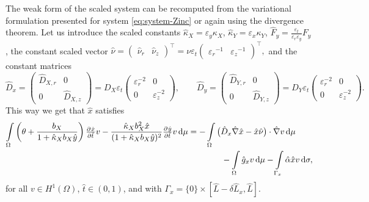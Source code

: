 \documentclass[11pt]{article}
\numberwithin{equation}{section}
\begin{document}
The weak form of the scaled system can be recomputed from the variational formulation presented for system \eqref{eq:system-Zinc} or again using the divergence theorem. %
Let us introduce the scaled constants 
\(\hat{\kappa}_X = \varepsilon_y \kappa_X\), \(\hat{\kappa}_Y = \varepsilon_x \kappa_Y\), \(\hat{F}_y = \frac{\varepsilon_t}{\varepsilon_r \varepsilon_y} F_y \),
the constant scaled vector 
\(
    \hat{\nu} = 
    (\begin{smallmatrix}
        \hat{\nu}_r
        &
        \hat{\nu}_z
    \end{smallmatrix})^\top
    =
    \nu \varepsilon_t
    (\begin{smallmatrix}
        {\varepsilon_r}^{-1}
        &
        {\varepsilon_z}^{-1}
    \end{smallmatrix})^\top,
\) 
and the constant matrices
\[
    \hat{D}_x = 
    \begin{pmatrix}
         \hat{D}_{X,r} & 0 
         \\
        0 &  \hat{D}_{X,z}
    \end{pmatrix}
    =
    D_X \varepsilon_t
    \begin{pmatrix}
         \varepsilon_r^{-2} & 0 
         \\
        0 &  \varepsilon_z^{-2}
    \end{pmatrix}
    ,\qquad
    \hat{D}_y = 
    \begin{pmatrix}
         \hat{D}_{Y,r} & 0 
         \\
        0 &  \hat{D}_{Y,z}
    \end{pmatrix}
    =
    D_Y \varepsilon_t
    \begin{pmatrix}
         \varepsilon_r^{-2} & 0 
         \\
        0 &  \varepsilon_z^{-2}
    \end{pmatrix}.
\]
This way we get that \( \hat{x}\) satisfies
\begin{equation}
\label{eq:non-dim-x}
\begin{aligned}
    \int\limits_\Omega
    \left( \theta + \frac{b_X}{1 + \hat{\kappa}_X b_X \hat{y}} \right)  \pd{\hat{x}}{\hat{t}} v 
    -
    \frac{\hat{\kappa}_X b_X^2 \hat{x}}{(1+\hat{\kappa}_X b_X \hat{y})^2} \pd{\hat y}{\hat t} v
    \dif\mu
    &=
    -\int\limits_\Omega 
    \big( \hat{D}_x \hat{\nabla} \hat{x} - \hat{x}\hat{\nu}\big) \cdot \hat{\nabla} v \dif\mu
    \\
    &\qquad\qquad
    -\int\limits_\Omega \hat{g}_x v \dif\mu
    -\int\limits_{\Gamma_{x}}    \hat{\alpha} \hat{x} v    \dif \sigma,
\end{aligned}
\end{equation}
for all \( v\in H^1 (\Omega)\), \(\hat{t}\in (0,1)\), and
with $\Gamma_{x} = \{0\}\times [\hat{L}-\delta \hat{L}_x,\hat{L}]$.
\end{document}
